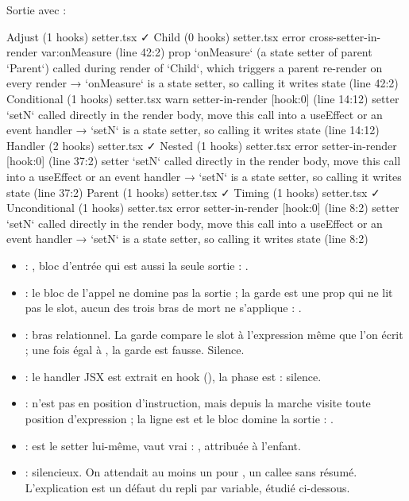 Sortie avec  :

\begin{sortie}
  Adjust  (1 hooks)  setter.tsx  ✓
  Child  (0 hooks)  setter.tsx
    error  cross-setter-in-render  var:onMeasure  (line 42:2)  prop `onMeasure` (a state setter of parent `Parent`) called during render of `Child`, which triggers a parent re-render on every render
       → `onMeasure` is a state setter, so calling it writes state (line 42:2)
  Conditional  (1 hooks)  setter.tsx
    warn   setter-in-render  [hook:0]  (line 14:12)  setter `setN` called directly in the render body, move this call into a useEffect or an event handler
       → `setN` is a state setter, so calling it writes state (line 14:12)
  Handler  (2 hooks)  setter.tsx  ✓
  Nested  (1 hooks)  setter.tsx
    error  setter-in-render  [hook:0]  (line 37:2)  setter `setN` called directly in the render body, move this call into a useEffect or an event handler
       → `setN` is a state setter, so calling it writes state (line 37:2)
  Parent  (1 hooks)  setter.tsx  ✓
  Timing  (1 hooks)  setter.tsx  ✓
  Unconditional  (1 hooks)  setter.tsx
    error  setter-in-render  [hook:0]  (line 8:2)  setter `setN` called directly in the render body, move this call into a useEffect or an event handler
       → `setN` is a state setter, so calling it writes state (line 8:2)
\end{sortie}

\begin{itemize}
  \item {} : , bloc d'entrée qui est aussi la seule sortie : \Error.
  \item {} : le bloc de l'appel ne domine pas la sortie ; la garde  est une prop qui ne lit pas le slot, aucun des trois bras de mort ne s'applique : \Warning.
  \item {} : bras relationnel. La garde  compare le slot à l'expression même que l'on écrit ; une fois  égal à , la garde est fausse. Silence.
  \item {} : le handler JSX est extrait en hook (), la phase est  : silence.
  \item {} :  n'est pas en position d'instruction, mais depuis  la marche visite toute position d'expression ; la ligne est  et le bloc domine la sortie : \Error.
  \item {} :  est le setter lui-même,  vaut vrai : \Error{} , attribuée à l'enfant.
  \item {} : silencieux. On attendait au moins un \Warning{} pour , un callee sans résumé. L'explication est un défaut du repli par variable, étudié ci-dessous.
\end{itemize}

